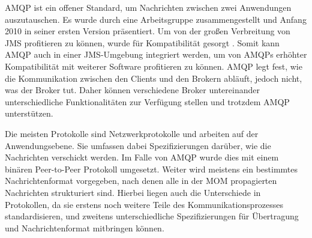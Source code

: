AMQP ist ein offener Standard, um Nachrichten zwischen zwei Anwendungen
auszutauschen. 
Es wurde durch eine Arbeitsgruppe zusammengestellt und Anfang 2010 in seiner
ersten Version präsentiert.
Um von der großen Verbreitung von JMS profitieren zu können, wurde für Kompatibilität
gesorgt \cite{vinoski2006advanced}. Somit kann AMQP auch in einer JMS-Umgebung
integriert werden, um von AMQPs erhöhter Kompatibilität mit weiterer Software
profitieren zu können.
AMQP legt fest, wie die Kommunikation zwischen den Clients und den Brokern abläuft,
jedoch nicht, was der Broker tut. Daher können verschiedene Broker untereinander
unterschiedliche Funktionalitäten zur Verfügung stellen und trotzdem AMQP
unterstützen.

Die meisten Protokolle sind Netzwerkprotokolle und arbeiten auf der Anwendungsebene.
Sie umfassen dabei Spezifizierungen darüber, wie die Nachrichten verschickt werden.
Im Falle von AMQP wurde dies mit einem binären Peer-to-Peer Protokoll umgesetzt.
Weiter wird meistens ein bestimmtes Nachrichtenformat vorgegeben, nach denen alle
in der MOM propagierten Nachrichten strukturiert sind. Hierbei liegen auch die
Unterschiede in Protokollen, da sie erstens noch weitere Teile des
Kommunikationsprozesses standardisieren, und zweitens unterschiedliche
Spezifizierungen für Übertragung und Nachrichtenformat mitbringen können.
\cite{vinoski2006advanced}
